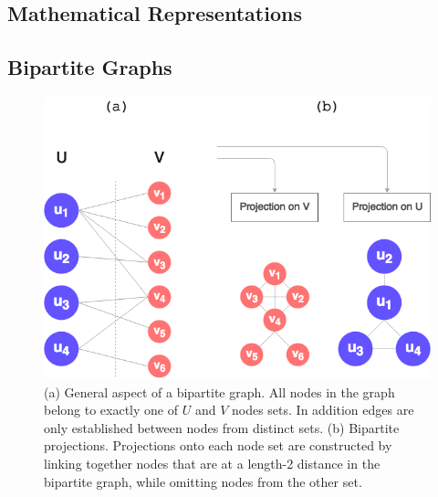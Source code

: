 \subsection{Mathematical Representations}





\subsection{Bipartite Graphs}

  \begin{figure}[h!]
  	\centering
    \includegraphics[width=0.5\linewidth]{figures/bipartite_general.png}
    \caption{(a) General aspect of a bipartite graph. All nodes in the graph belong to exactly one of $U$ and $V$ nodes sets. In addition edges are only established between nodes from distinct sets. (b) Bipartite projections. Projections onto each node set are constructed by linking together nodes that are at a length-2 distance in the bipartite graph, while omitting nodes from the other set.}
    \label{fig:bipartite_general}
  \end{figure}


